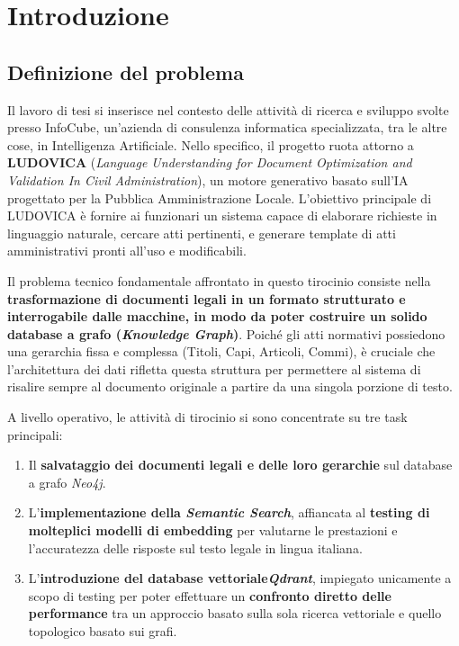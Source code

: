 \chapter{Introduzione}\label{chap:first}

\inlineminitoc

\section{Definizione del problema}
Il lavoro di tesi si inserisce nel contesto delle attività di ricerca e sviluppo svolte presso InfoCube, un'azienda di consulenza informatica specializzata, tra le altre cose, in Intelligenza Artificiale.
Nello specifico, il progetto ruota attorno a \textbf{LUDOVICA} (\textit{Language Understanding for Document Optimization and Validation In Civil Administration}), un motore generativo basato sull'IA progettato per la Pubblica Amministrazione Locale.
L'obiettivo principale di LUDOVICA è fornire ai funzionari un sistema capace di elaborare richieste in linguaggio naturale, cercare atti pertinenti, e generare template di atti amministrativi pronti all'uso e modificabili.

Il problema tecnico fondamentale affrontato in questo tirocinio consiste nella \textbf{trasformazione di documenti legali in un formato strutturato e interrogabile dalle macchine, in modo da poter costruire un solido database a grafo (\textit{Knowledge Graph})}.
Poiché gli atti normativi possiedono una gerarchia fissa e complessa (Titoli, Capi, Articoli, Commi), è cruciale che l'architettura dei dati rifletta questa struttura per permettere al sistema di risalire sempre al documento originale a partire da una singola porzione di testo.

A livello operativo, le attività di tirocinio si sono concentrate su tre task principali:
\begin{enumerate}
    \item Il \textbf{salvataggio dei documenti legali e delle loro gerarchie} sul database a grafo \textit{Neo4j}.
    \item L'\textbf{implementazione della \textit{Semantic Search}}, affiancata al \textbf{testing di molteplici modelli di embedding} per valutarne le prestazioni e l'accuratezza delle risposte sul testo legale in lingua italiana.
    \item L'\textbf{introduzione del database vettoriale\textit{Qdrant}}, impiegato unicamente a scopo di testing per poter effettuare un \textbf{confronto diretto delle performance} tra un approccio basato sulla sola ricerca vettoriale e quello topologico basato sui grafi.
\end{enumerate}

